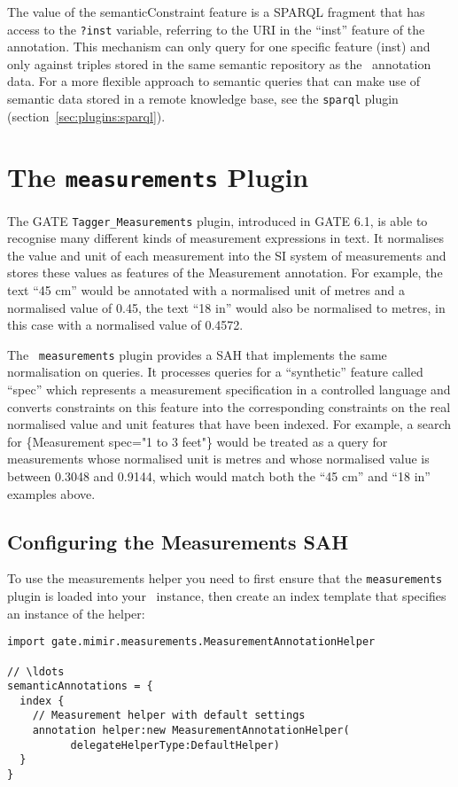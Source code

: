 The value of the semanticConstraint feature is a SPARQL fragment that has
access to the {\tt ?inst} variable, referring to the URI in the ``inst''
feature of the annotation.  This mechanism can only query for one specific
feature (inst) and only against triples stored in the same semantic repository
as the \Mimir\ annotation data.  For a more flexible approach to semantic
queries that can make use of semantic data stored in a remote knowledge base,
see the {\tt sparql} plugin (section~\ref{sec:plugins:sparql}).

\section{The {\tt measurements} Plugin}\label{sec:plugins:measurements}

The GATE {\tt Tagger\_Measurements} plugin, introduced in GATE 6.1, is able to
recognise many different kinds of measurement expressions in text.  It
normalises the value and unit of each measurement into the SI system of
measurements and stores these values as features of the Measurement annotation.
For example, the text ``45 cm'' would be annotated with a normalised unit of
metres and a normalised value of 0.45, the text ``18 in'' would also be
normalised to metres, in this case with a normalised value of 0.4572.

The \Mimir\ {\tt measurements} plugin provides a SAH that implements the same
normalisation on queries.  It processes queries for a ``synthetic'' feature
called ``spec'' which represents a measurement specification in a controlled
language and converts constraints on this feature into the corresponding
constraints on the real normalised value and unit features that have been
indexed.  For example, a search for \{Measurement spec="1 to 3 feet"\} would be
treated as a query for measurements whose normalised unit is metres and whose
normalised value is between 0.3048 and 0.9144, which would match both the ``45
cm'' and ``18 in'' examples above.

\subsection{Configuring the Measurements SAH}

To use the measurements helper you need to first ensure that the
{\tt measurements} plugin is loaded into your \Mimir\ instance, then create an
index template that specifies an instance of the helper:
\begin{lstlisting}[texcl]
import gate.mimir.measurements.MeasurementAnnotationHelper

// \ldots
semanticAnnotations = {
  index {
    // Measurement helper with default settings
    annotation helper:new MeasurementAnnotationHelper(
          delegateHelperType:DefaultHelper)
  }
}
\end{lstlisting}

